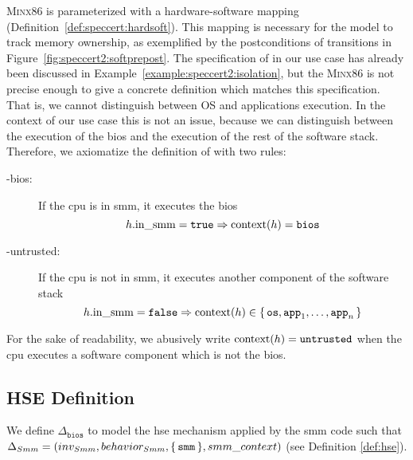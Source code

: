 {\scshape Minx86} is parameterized with a hardware-software mapping
 (Definition~\ref{def:speccert:hardsoft}).
%
This mapping is necessary for the model to track memory ownership, as
exemplified by the postconditions of  transitions in
Figure~\ref{fig:speccert2:softprepost}.
%
The specification of  in our use case has already been discussed
in Example~\ref{example:speccert2:isolation}, but the {\scshape Minx86} is not
precise enough to give a concrete definition which matches this specification.
%
That is, we cannot distinguish between OS and applications execution.
%
In the context of our use case this is not an issue, because we can distinguish
between the execution of the \ac{bios} and the execution of the rest of the
software stack.
%
Therefore, we axiomatize the definition of  with two rules:
%
\begin{description}
\item [-bios:] If the \ac{cpu} is in \ac{smm}, it executes the
  \ac{bios}
  \[
    h.\mathrm{in\_smm} = \mathtt{true} \Rightarrow \mathrm{context}(h) = \mathtt{bios}
  \]
\item [-untrusted:] If the \ac{cpu} is not in \ac{smm}, it
  executes another component of the software stack
  \[
    h.\mathrm{in\_smm} = \mathtt{false} \Rightarrow \mathrm{context}(h) \in
    \{\,\mathtt{os}, \mathtt{app}_1, \dots, \mathtt{app}_n\,\}
  \]
\end{description}

For the sake of readability, we abusively write
\( \mathrm{context}(h) = \mathtt{untrusted} \) when the \ac{cpu} executes a
software component which is not the \ac{bios}.

\subsection{HSE Definition}

We define $\Delta_{\mathtt{bios}}$ to model the \ac{hse} mechanism applied by
the \ac{smm} code such that
$\Delta_{Smm} = (inv_{Smm}, behavior_{Smm}, \{\,\mathtt{smm}\,\},
smm\_context)$ (see Definition \ref{def:hse}).

